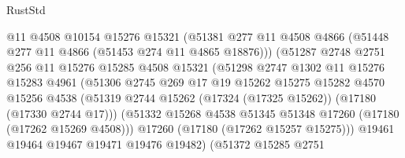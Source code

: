 \begin{lexlean}{RustStd}
\begin{coremodule}
{\begin{coremodule}
{{{{{{{{{{{{{{{{{{{{{{{{{{{{{{{{{{{{{{{{{{{{{{{{{{{{{{{                              @11
                              @4508
                              @10154
                              @15276
                              @15321
                              (@51381
                                @277
                                @11
                                @4508
                                @4866
                                (@51448 @277 @11 @4866 (@51453 @274 @11 @4865 @18876)))
                              (@51287
                                @2748
                                @2751
                                @256
                                @11
                                @15276
                                @15285
                                @4508
                                @15321
                                (@51298
                                  @2747
                                  @1302
                                  @11
                                  @15276
                                  @15283
                                  @4961
                                  (@51306
                                    @2745
                                    @269
                                    @17
                                    @19
                                    @15262
                                    @15275
                                    @15282
                                    @4570
                                    @15256
                                    @4538
                                    (@51319
                                      @2744
                                      @15262
                                      (@17324 (@17325 @15262))
                                      (@17180 (@17330 @2744 @17)))
                                    (@51332
                                      @15268
                                      @4538
                                      @51345
                                      @51348
                                      @17260
                                      (@17180 (@17262 @15269 @4508)))
                                    @17260
                                    (@17180 (@17262 @15257 @15275)))
                                  @19461
                                  @19464
                                  @19467
                                  @19471
                                  @19476
                                  @19482)
                                (@51372
                                  @15285
                                  @2751
}}}}}}}}}}}}}}}}}}}}}}}}}}}}}}}}}}}}}}}}}}}}}}}}}}}}}}}
\end{coremodule}}
\end{coremodule}
\end{lexlean}
